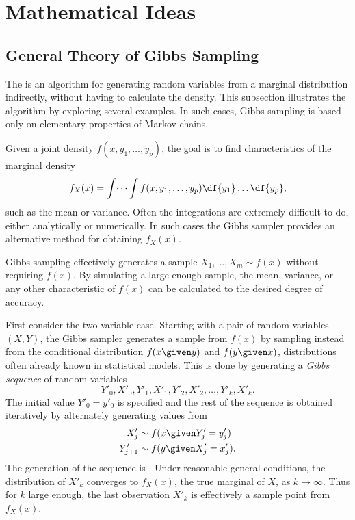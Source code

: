 \documentclass[12pt]{article}
\begin{document}
\hr

\section*{Mathematical Ideas}
\subsection*{General Theory of Gibbs Sampling}

The %
is an algorithm for generating random variables from a marginal
distribution indirectly, without having to calculate the density.  This
subsection illustrates the algorithm by exploring several examples.  In
such cases, Gibbs sampling is based only on elementary properties of
Markov chains.

Given a joint density \( f(x, y_1, \dots, y_p) \),%
the goal is to find characteristics of the marginal density%
\[
    f_{X}(x) = \int \dots \int f(x, y_1, \dots, y_p) \df{y_1} \dots \df{y_p},
\] such as the mean or variance.  Often the integrations are extremely
difficult to do, either analytically or numerically.  In such cases the
Gibbs sampler provides an alternative method for obtaining \( f_X(x) \).

Gibbs sampling%
effectively generates a sample \( X_1, \dots, X_m \sim f(x) \) without
requiring \( f(x) \).  By simulating a large enough sample, the mean,
variance, or any other characteristic of \( f(x) \) can be calculated to
the desired degree of accuracy.

First consider the two-variable case.  Starting with a pair of random
variables \( (X, Y) \), the Gibbs sampler generates a sample from \( f(x)
\) by sampling instead from the conditional distribution \( f(x \given y)
\) and \( f(y \given x) \), distributions often already known in
statistical models.  This is done by generating a \emph{Gibbs sequence}%
of random variables
\begin{equation}
    Y'_0, X'_0, Y'_1, X'_1, Y'_2, X'_2, \dots, Y'_k, X'_k.%
    \label{eq:applicationsmetropolis:gibbsseq}
\end{equation}
The initial value \( Y'_0 = y'_0 \) is specified and the rest of the
sequence is obtained iteratively by alternately generating values from
\begin{align*}
    X'_j &\sim f(x \given Y'_j = y'_j) \\
    Y'_{j+1} &\sim f(y \given X'_j = x'_j).  \\
\end{align*}
The generation of the sequence is .%
Under reasonable general conditions, the distribution of \( X'_k \)
converges to \( f_X(x) \), the true marginal of \( X \), as \( k \to
\infty \).  Thus for \( k \) large enough, the last observation \( X'_k \)
is effectively a sample point from \( f_X(x) \).
\end{document}
